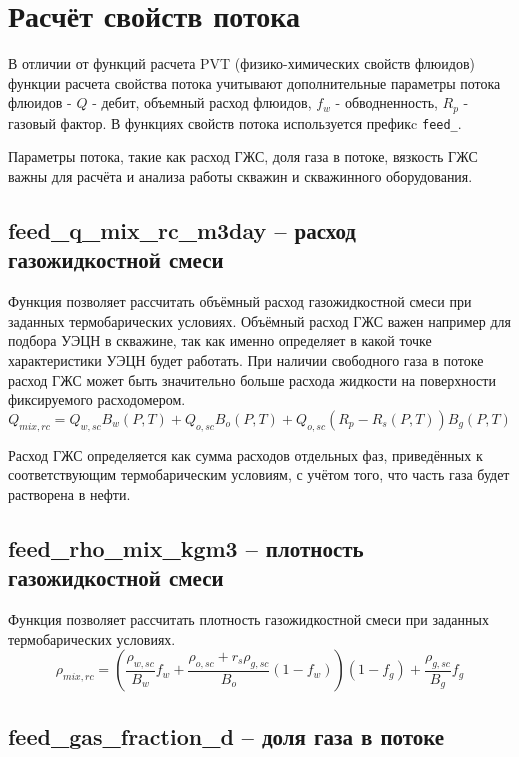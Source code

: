 \section{Расчёт свойств потока}

В отличии от функций расчета PVT (физико-химических свойств флюидов) функции расчета свойства потока учитывают дополнительные параметры потока флюидов - $Q$ - дебит, объемный расход флюидов, $f_w$ - обводненность, $R_p$ - газовый фактор. В функциях свойств потока используется префикc \texttt{feed_}.

Параметры потока, такие как расход ГЖС, доля газа в потоке, вязкость ГЖС важны для расчёта и анализа работы скважин и скважинного оборудования.


\subsection{feed\_q\_mix\_rc\_m3day – расход газожидкостной смеси}

Функция позволяет рассчитать объёмный расход газожидкостной смеси при заданных термобарических условиях. Объёмный расход ГЖС важен например для подбора УЭЦН в скважине, так как именно определяет в какой точке характеристики УЭЦН будет работать. При наличии свободного газа в потоке расход ГЖС может быть значительно больше расхода жидкости на поверхности фиксируемого расходомером.
$$Q_{mix,rc} = Q_{w,sc} B_w(P,T) + Q_{o,sc} B_o(P,T)  + Q_{o,sc}  (R_p - R_s(P,T)) B_g(P,T) $$

Расход ГЖС определяется как сумма расходов отдельных фаз, приведённых к соответствующим термобарическим условиям, с учётом того, что часть газа будет растворена в нефти.


\subsection{feed\_rho\_mix\_kgm3 – плотность газожидкостной смеси}

Функция позволяет рассчитать плотность газожидкостной смеси при заданных термобарических условиях. 
$$\rho_{mix,rc} = \left( \frac{\rho_{w,sc}}{B_w} f_w + \frac{\rho_{o,sc} +r_s \rho_{g,sc} }{B_o}(1-f_w) \right) (1-f_g) + \frac{ \rho_{g,sc} }{B_g} f_g $$


\subsection{feed\_gas\_fraction\_d – доля газа в потоке}

